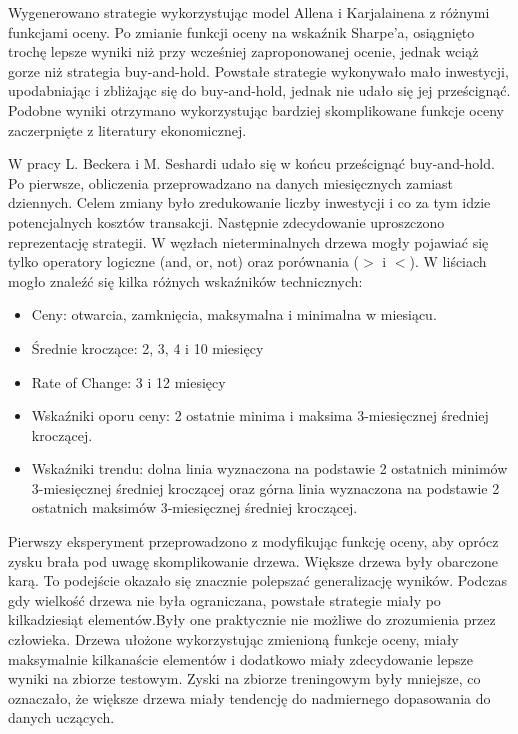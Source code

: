 \documentclass[twoside]{iisthesis}
\begin{document}
Wygenerowano strategie wykorzystując model Allena i Karjalainena z różnymi funkcjami oceny. Po zmianie funkcji oceny na wskaźnik Sharpe'a, osiągnięto trochę lepsze wyniki niż przy wcześniej zaproponowanej ocenie, jednak wciąż gorze niż strategia buy-and-hold. Powstałe strategie wykonywało mało inwestycji, upodabniając i zbliżając się do buy-and-hold, jednak nie udało się jej prześcignąć. Podobne wyniki otrzymano wykorzystując bardziej skomplikowane funkcje oceny zaczerpnięte z literatury ekonomicznej.

W pracy L. Beckera i M. Seshardi \cite{Becker:2003} udało się w końcu prześcignąć buy-and-hold. Po pierwsze, obliczenia przeprowadzano na danych miesięcznych zamiast dziennych. Celem zmiany było zredukowanie liczby inwestycji i co za tym idzie potencjalnych kosztów transakcji. Następnie zdecydowanie uproszczono reprezentację strategii. W węzłach nieterminalnych drzewa mogły pojawiać się tylko operatory logiczne (and, or, not) oraz porównania ($>$ i $<$).  W liściach mogło znaleźć się kilka różnych wskaźników technicznych:

\begin{itemize}
	\item Ceny: otwarcia, zamknięcia, maksymalna i minimalna w miesiącu.
	\item Średnie kroczące: 2, 3, 4 i 10 miesięcy
	\item Rate of Change: 3 i 12 miesięcy
	\item Wskaźniki oporu ceny: 2 ostatnie minima i maksima 3-miesięcznej średniej kroczącej.
	\item Wskaźniki trendu: dolna linia wyznaczona na podstawie 2 ostatnich minimów 3-miesięcznej średniej kroczącej oraz górna linia wyznaczona na podstawie 2 ostatnich maksimów 3-miesięcznej średniej kroczącej.
\end{itemize}

Pierwszy eksperyment przeprowadzono z modyfikując funkcję oceny, aby oprócz zysku brała pod uwagę skomplikowanie drzewa. Większe drzewa były obarczone karą. To podejście okazało się znacznie polepszać generalizację wyników. Podczas gdy wielkość drzewa nie była ograniczana, powstałe strategie miały po kilkadziesiąt elementów.Były one praktycznie nie możliwe do zrozumienia przez człowieka. Drzewa ułożone wykorzystując zmienioną funkcje oceny, miały maksymalnie kilkanaście elementów i dodatkowo miały zdecydowanie lepsze wyniki na zbiorze testowym. Zyski na zbiorze treningowym były mniejsze, co oznaczało, że większe drzewa miały tendencję do nadmiernego dopasowania do danych uczących. 
\end{document}
